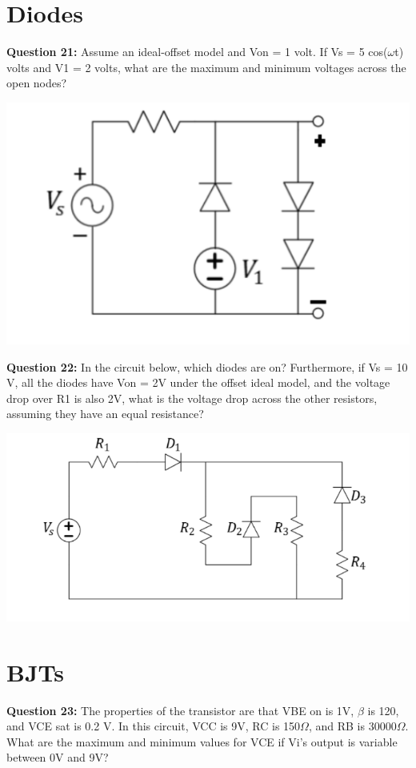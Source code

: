 \documentclass{article}
\begin{document}
\pagebreak

\section*{Diodes}
\textbf{Question 21:} Assume an ideal-offset model and Von = 1 volt. If Vs = 5 cos(\(\omega\)t) volts and V1 = 2 volts, what are the maximum and minimum voltages across the open nodes?

\begin{center}

        \includegraphics[width=0.75\linewidth]{figures/45.png}
\end{center}

\textbf{Question 22:} In the circuit below, which diodes are on? Furthermore, if Vs = 10 V, all the diodes have Von = 2V under the offset ideal model, and the voltage drop over R1 is also 2V, what is the voltage drop across the other resistors, assuming they have an equal resistance?

\begin{center}
    \includegraphics[width=0.75\linewidth]{figures/46.png}
\end{center}

\pagebreak

\section*{BJTs}
\textbf{Question 23:} The properties of the transistor are that VBE on is 1V, \(\beta\) is 120, and VCE sat is 0.2 V. In this circuit, VCC is 9V, RC is 150\(\Omega\), and RB is 30000\(\Omega\). What are the maximum and minimum values for VCE if Vi’s output is variable between 0V and 9V?
\end{document}
